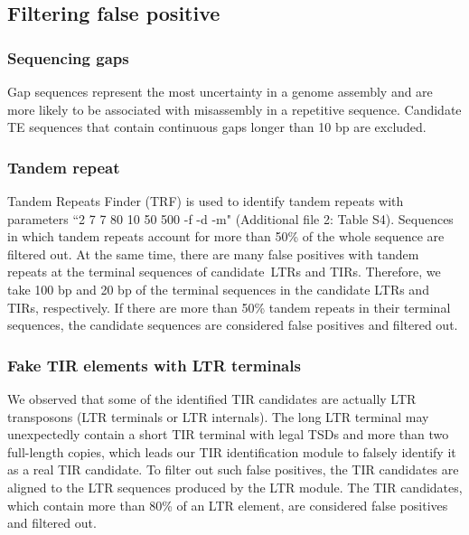 \documentclass{bmcart}
\begin{document}

\subsection*{Filtering false positive}
\subsubsection*{Sequencing gaps}
Gap sequences represent the most uncertainty in a genome assembly and are more likely to be associated with misassembly in a repetitive sequence\cite{ou2019benchmarking}. Candidate TE sequences that contain continuous gaps longer than 10 bp are excluded.

\subsubsection*{Tandem repeat}
Tandem Repeats Finder (TRF)\cite{benson1999tandem} is used to identify tandem repeats with parameters ``2 7 7 80 10 50 500 -f -d -m" (Additional file 2: Table S4). Sequences in which tandem repeats account for more than 50\% of the whole sequence are filtered out. At the same time, there are many false positives with tandem repeats at the terminal sequences of candidate LTRs and TIRs. Therefore, we take 100 bp and 20 bp of the terminal sequences in the candidate LTRs and TIRs, respectively. If there are more than 50\% tandem repeats in their terminal sequences, the candidate sequences are considered false positives and filtered out.

\subsubsection*{Fake TIR elements with LTR terminals}
We observed that some of the identified TIR candidates are actually LTR transposons (LTR terminals or LTR internals). The long LTR terminal may unexpectedly contain a short TIR terminal with legal TSDs and more than two full-length copies, which leads our TIR identification module to falsely identify it as a real TIR candidate. To filter out such false positives, the TIR candidates are aligned to the LTR sequences produced by the LTR module. The TIR candidates, which contain more than 80\% of an LTR element, are considered false positives and filtered out.
\end{document}
